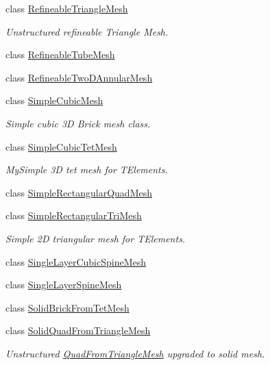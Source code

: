 \begin{DoxyCompactItemize}
\item 
class \hyperlink{classoomph_1_1RefineableTriangleMesh}{Refineable\+Triangle\+Mesh}
\begin{DoxyCompactList}\small\item\em Unstructured refineable Triangle Mesh. \end{DoxyCompactList}\item 
class \hyperlink{classoomph_1_1RefineableTubeMesh}{Refineable\+Tube\+Mesh}
\item 
class \hyperlink{classoomph_1_1RefineableTwoDAnnularMesh}{Refineable\+Two\+D\+Annular\+Mesh}
\item 
class \hyperlink{classoomph_1_1SimpleCubicMesh}{Simple\+Cubic\+Mesh}
\begin{DoxyCompactList}\small\item\em Simple cubic 3D Brick mesh class. \end{DoxyCompactList}\item 
class \hyperlink{classoomph_1_1SimpleCubicTetMesh}{Simple\+Cubic\+Tet\+Mesh}
\begin{DoxyCompactList}\small\item\em My\+Simple 3D tet mesh for T\+Elements. \end{DoxyCompactList}\item 
class \hyperlink{classoomph_1_1SimpleRectangularQuadMesh}{Simple\+Rectangular\+Quad\+Mesh}
\item 
class \hyperlink{classoomph_1_1SimpleRectangularTriMesh}{Simple\+Rectangular\+Tri\+Mesh}
\begin{DoxyCompactList}\small\item\em Simple 2D triangular mesh for T\+Elements. \end{DoxyCompactList}\item 
class \hyperlink{classoomph_1_1SingleLayerCubicSpineMesh}{Single\+Layer\+Cubic\+Spine\+Mesh}
\item 
class \hyperlink{classoomph_1_1SingleLayerSpineMesh}{Single\+Layer\+Spine\+Mesh}
\item 
class \hyperlink{classoomph_1_1SolidBrickFromTetMesh}{Solid\+Brick\+From\+Tet\+Mesh}
\item 
class \hyperlink{classoomph_1_1SolidQuadFromTriangleMesh}{Solid\+Quad\+From\+Triangle\+Mesh}
\begin{DoxyCompactList}\small\item\em Unstructured \hyperlink{classoomph_1_1QuadFromTriangleMesh}{Quad\+From\+Triangle\+Mesh} upgraded to solid mesh. \end{DoxyCompactList}\item 

\end{DoxyCompactItemize}
